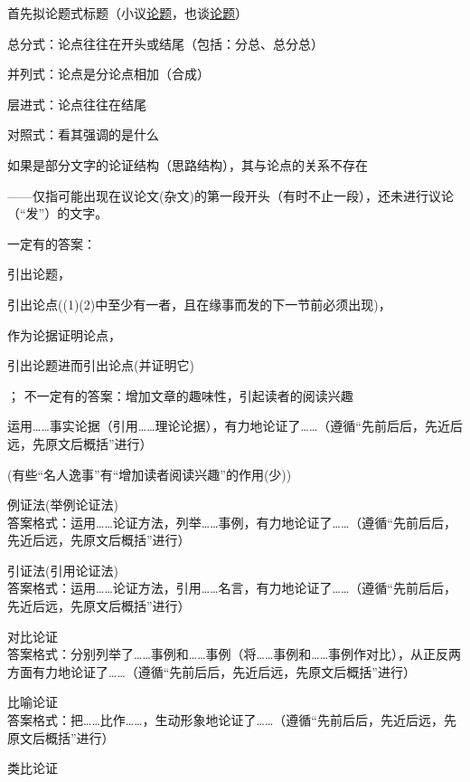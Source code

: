 \begin{asparaenum}
\item 首先拟论题式标题（小议\uline{论题}，也谈\uline{论题}）
\end{asparaenum}

\begin{asparaenum}[(1)]
\item 总分式：论点往往在开头或结尾（包括：分总、总分总）
\item 并列式：论点是分论点相加（合成）
\item 层进式：论点往往在结尾
\item 对照式：看其强调的是什么
\end{asparaenum}

如果是部分文字的论证结构（思路结构），其与论点的关系不存在

——仅指可能出现在议论文(杂文)的第一段开头（有时不止一段），还未进行议论（``发''）的文字。\par
一定有的答案：\begin{inparaenum}[(1)]\item 引出论题，\item 引出论点((1)(2)中至少有一者，且在缘事而发的下一节前必须出现)，\item 作为论据证明论点，\item 引出论题进而引出论点(并证明它)\end{inparaenum}；
不一定有的答案：增加文章的趣味性，引起读者的阅读兴趣

运用\ldots{}\ldots{}事实论据（引用\ldots{}\ldots{}理论论据），有力地论证了\ldots{}\ldots{}（遵循``先前后后，先近后远，先原文后概括''进行）

(有些``名人逸事''有``增加读者阅读兴趣''的作用(少))

\begin{asparaenum}[(1)]
\item 例证法(举例论证法)\\
答案格式：运用\ldots{}\ldots{}论证方法，列举\ldots{}\ldots{}事例，有力地论证了\ldots{}\ldots{}（遵循``先前后后，先近后远，先原文后概括''进行）
\item 引证法(引用论证法)\\
答案格式：运用\ldots{}\ldots{}论证方法，引用\ldots{}\ldots{}名言，有力地论证了\ldots{}\ldots{}（遵循``先前后后，先近后远，先原文后概括''进行）
\item 对比论证\\
答案格式：分别列举了\ldots{}\ldots{}事例和\ldots{}\ldots{}事例（将\ldots{}\ldots{}事例和\ldots{}\ldots{}事例作对比），从正反两方面有力地论证了\ldots{}\ldots{}（遵循``先前后后，先近后远，先原文后概括''进行）
\item 比喻论证\\
答案格式：把\ldots{}\ldots{}比作\ldots{}\ldots{}，生动形象地论证了\ldots{}\ldots{}（遵循``先前后后，先近后远，先原文后概括''进行）
\item 类比论证
\end{asparaenum}

